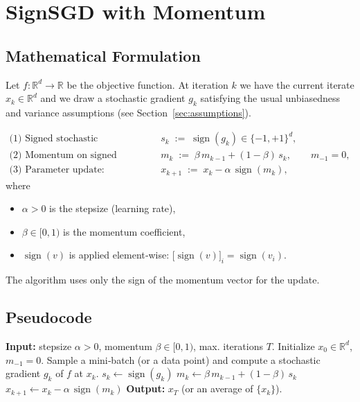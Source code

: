 \documentclass{article}
\newcommand{\R}{\mathbb{R}}
\newcommand{\sgn}{\operatorname{sign}}
\begin{document}
\section*{SignSGD with Momentum}

\subsection*{Mathematical Formulation}
Let $f:\R^{d}\rightarrow\R$ be the objective function.  
At iteration $k$ we have the current iterate $x_{k}\in\R^{d}$ and we draw a stochastic
gradient $g_{k}$ satisfying the usual unbiasedness and variance assumptions
(see Section~\ref{sec:assumptions}).  

\[
\begin{aligned}
\text{(1) Signed stochastic gradient:}&\qquad s_{k}\;:=\;\sgn(g_{k})\in\{-1,+1\}^{d},\\[4pt]
\text{(2) Momentum on signed gradients:}&\qquad 
m_{k}\;:=\;\beta\,m_{k-1}+(1-\beta)\,s_{k},
\qquad m_{-1}=0,\\[4pt]
\text{(3) Parameter update:}&\qquad 
x_{k+1}\;:=\;x_{k}-\alpha\,\sgn(m_{k}),
\end{aligned}
\]
where 
\begin{itemize}
\item $\alpha>0$ is the stepsize (learning rate),
\item $\beta\in[0,1)$ is the momentum coefficient,
\item $\sgn(v)$ is applied element‑wise: $\bigl[\sgn(v)\bigr]_{i}=\sgn(v_{i})$.
\end{itemize}
The algorithm uses only the sign of the momentum vector for the update.

\subsection*{Pseudocode}
\begin{algorithm}[H]
\caption{SignSGD with Momentum}
\label{alg:signsgd}
\begin{algorithmic}[1]
\State \textbf{Input:} stepsize $\alpha>0$, momentum $\beta\in[0,1)$,
        max. iterations $T$.
\State Initialize $x_{0}\in\R^{d}$, $m_{-1}=0$.
    \State Sample a mini‑batch (or a data point) and compute a stochastic gradient $g_{k}$ of $f$ at $x_{k}$.
    \State $s_{k}\gets\sgn(g_{k})$                          
    \State $m_{k}\gets\beta\,m_{k-1}+(1-\beta)\,s_{k}$      
    \State $x_{k+1}\gets x_{k}-\alpha\,\sgn(m_{k})$        
\EndFor
\State \textbf{Output:} $x_{T}$ (or an average of $\{x_{k}\}$).
\end{algorithmic}
\end{algorithm}
\end{document}
